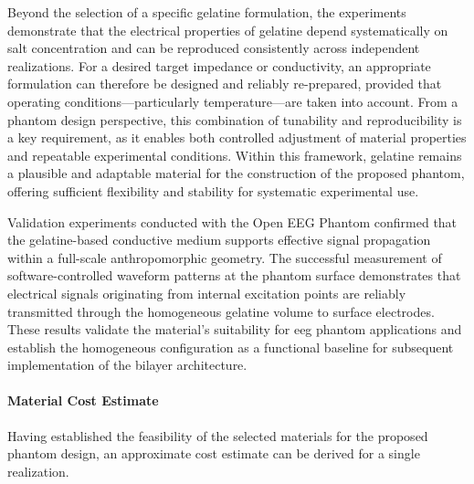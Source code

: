 \documentclass[../00_Main.tex]{subfiles}
\begin{document}
Beyond the selection of a specific gelatine formulation, the experiments demonstrate that
the electrical properties of gelatine depend systematically on salt concentration and can
be reproduced consistently across independent realizations.
For a desired target impedance or conductivity, an appropriate formulation can therefore
be designed and reliably re-prepared, provided that operating conditions---particularly
temperature---are taken into account.
From a phantom design perspective, this combination of tunability and reproducibility is a
key requirement, as it enables both controlled adjustment of material properties and
repeatable experimental conditions.
Within this framework, gelatine remains a plausible and adaptable material for the
construction of the proposed phantom, offering sufficient flexibility and stability for
systematic experimental use.

Validation experiments conducted with the Open EEG Phantom confirmed that the gelatine-based conductive medium supports effective signal propagation within a full-scale anthropomorphic geometry. The successful measurement of software-controlled waveform patterns at the phantom surface demonstrates that electrical signals originating from internal excitation points are reliably transmitted through the homogeneous gelatine volume to surface electrodes. These results validate the material's suitability for \gls{eeg} phantom applications and establish the homogeneous configuration as a functional baseline for subsequent implementation of the bilayer architecture.

\paragraph*{Material Cost Estimate}
Having established the feasibility of the selected materials for the proposed phantom
design, an approximate cost estimate can be derived for a single realization.
\end{document}
